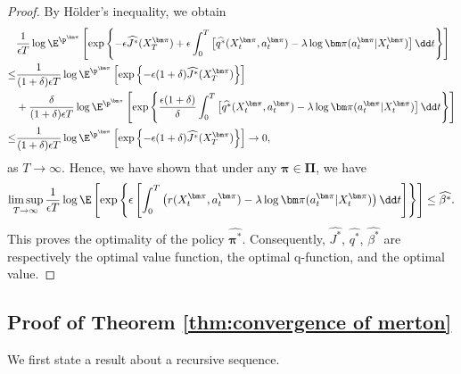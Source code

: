 \begin{proof}
By H\"older's inequality, we obtain 
\[
\begin{aligned}
& \frac{1}{\epsilon T}\log\E^{\p^{\bm\pi}}\left[ \exp\left\{ -\epsilon \widehat{J^*}(X_T^{\bm\pi}) + \epsilon \int_0^T \left[ \widehat{q^*}(X_t^{\bm\pi}, a_t^{\bm\pi}) - \lambda\log\bm\pi(a_t^{\bm\pi} | X_t^{\bm\pi}) \right] \dd t \right\}  \right] \\
\leq & \frac{1}{(1+\delta)\epsilon T }\log \E^{\p^{\bm\pi}}\left[ \exp\left\{ -\epsilon(1+\delta) \widehat{J^*}(X_T^{\bm\pi}) \right\}  \right] \\
& + \frac{\delta}{(1+\delta) \epsilon T} \log \E^{\p^{\bm\pi}}\left[ \exp\left\{  \frac{\epsilon( 1+\delta)}{\delta} \int_0^T \left[ \widehat{q^*}(X_t^{\bm\pi}, a_t^{\bm\pi}) - \lambda\log\bm\pi(a_t^{\bm\pi} | X_t^{\bm\pi}) \right] \dd t \right\}  \right] \\
\leq & \frac{1}{(1+\delta)\epsilon T }\log \E^{\p^{\bm\pi}}\left[ \exp\left\{ -\epsilon(1+\delta) \widehat{J^*}(X_T^{\bm\pi}) \right\}  \right] \to 0,
\end{aligned}
\]
as $T\to\infty$. Hence, we have shown that under any $\bm\pi\in \bm\Pi$, we have 
\[ \limsup_{T\to \infty} \frac{1}{\epsilon T} \log \E\left[ \exp\left\{ \epsilon\left[  \int_0^T \left(  r(X_t^{\bm\pi}, a_t^{\bm\pi}) -\lambda \log\bm\pi(a_t^{\bm\pi} | X_t^{\bm\pi})\right)\dd t \right]  \right\} \right] \leq \widehat{\beta^*} .  \]
This proves the optimality of the policy $\widehat{\bm\pi^*}$. Consequently, $\widehat{J^*}$, $\widehat{q^*}$, $\widehat{\beta^*}$ are respectively the optimal value function, the optimal q-function, and the optimal value.
\end{proof}

\subsection{Proof of Theorem \ref{thm:convergence of merton}}
We first state a result about a recursive sequence.

